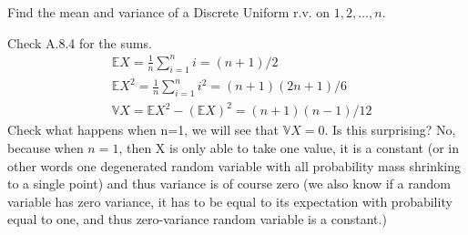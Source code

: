 
\setcounter{theorem}{4}
\begin{exercise} [BH.4.5] Find the mean and variance of a Discrete Uniform r.v. on $1, 2, \ldots, n$.
\begin{solution}
    Check A.8.4 for the sums. 
	\begin{align*}
		&\mathbb{E}X=\frac{1}{n}\sum_{i=1}^{n} i= (n+1)/2\\
		&\mathbb{E}X^2=\frac{1}{n}\sum_{i=1}^{n}i^2 = (n+1)(2n+1)/6 \\
		&\mathbb{V}X= \mathbb{E}X^2 -(\mathbb{E}X)^2 =  (n+1)(n-1)/12
	\end{align*}
	Check what happens when n=1, we will see that $\mathbb{V}X=0$. Is this surprising? No, because when $n=1$, then X is only able to take one value, it is a constant (or in other words one degenerated random variable with all probability mass shrinking to a single point) and thus variance is of course zero (we also know if a random variable has zero variance, it has to be equal to its expectation with probability equal to one, and thus zero-variance random variable is a constant.)
\end{solution}
\end{exercise}

